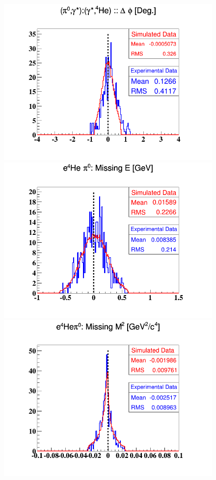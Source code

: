 \begin{figure}[h!]
\includegraphics[scale=0.35]{fig_dvcs/comp/Coh_pi0_delta_phi.png}
\includegraphics[scale=0.35]{fig_dvcs/comp/Coh_pi0_e4Hepi0_E_Mis.png}
\includegraphics[scale=0.35]{fig_dvcs/comp/Coh_pi0_e4Hepi0_M2_Mis.png}

\end{figure}
